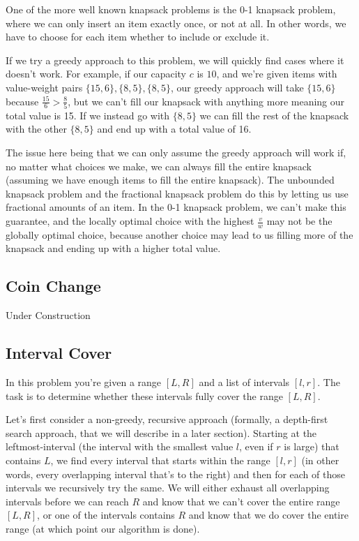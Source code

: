 \hrulefill

One of the more well known knapsack problems is the 0-1 knapsack  problem, where we can only insert an item exactly once, or not at all. In other words, we have to choose for each item whether to include or exclude it.

If we try a greedy approach to this problem, we will quickly find cases where it doesn't work. For example, if our capacity $c$ is $10$, and we're given items with value-weight pairs $\{15,6\},\{8,5\},\{8,5\}$, our greedy approach will take $\{15,6\}$ because $\frac{15}{6} > \frac{8}{5}$, but we can't fill our knapsack with anything more meaning our total value is 15. If we instead go with $\{8,5\}$ we can fill the rest of the knapsack with the other $\{8,5\}$ and end up with a total value of 16.

The issue here being that we can only assume the greedy approach will work if, no matter what choices we make, we can always fill the entire knapsack (assuming we have enough items to fill the entire knapsack). The unbounded knapsack problem and the fractional knapsack problem do this by letting us use fractional amounts of an item. In the 0-1 knapsack problem, we can't make this guarantee, and the locally optimal choice with the highest $\frac{v}{w}$ may not be the globally optimal choice, because another choice may lead to us filling more of the knapsack and ending up with a higher total value.

\subsection{Coin Change}

Under Construction

\subsection{Interval Cover}

In this problem you're given a range $[L,R]$ and a list of intervals $[l,r]$. The task is to determine whether these intervals fully cover the range $[L,R]$.

Let's first consider a non-greedy, recursive approach (formally, a depth-first search approach, that we will describe in a later section). Starting at the leftmost-interval (the interval with the smallest value $l$, even if $r$ is large) that contains $L$, we find every interval that starts within the range $[l,r]$ (in other words, every overlapping interval that's to the right) and then for each of those intervals we recursively try the same. We will either exhaust all overlapping intervals before we can reach $R$ and know that we can't cover the entire range $[L,R]$, or one of the intervals contains $R$ and know that we do cover the entire range (at which point our algorithm is done).

